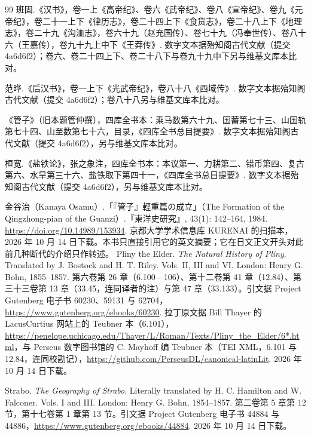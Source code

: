 \begin{thebibliography}{99}
 班固.《汉书》，卷一上《高帝纪》、卷六《武帝纪》、卷八《宣帝纪》、卷九《元帝纪》，卷二十一上下《律历志》，卷二十四上下《食货志》，卷二十八上下《地理志》，卷二十九《沟洫志》，卷六十九（赵充国传）、卷七十九（冯奉世传）、卷八十六（王嘉传），卷九十九上中下《王莽传》. 数字文本据殆知阁古代文献（提交 4a6d6f2）；卷六、卷二十四上下、卷二十八下与卷九十九中下另与维基文库本比对。

 范晔.《后汉书》，卷一上下《光武帝纪》，卷八十八《西域传》. 数字文本据殆知阁古代文献（提交 4a6d6f2）；卷八十八另与维基文库本比对。

 《管子》（旧本题管仲撰），四库全书本：乘马数第六十九、国蓄第七十三、山国轨第七十四、山至数第七十六，目录，《四库全书总目提要》. 数字文本据殆知阁古代文献（提交 4a6d6f2），另与维基文库本比对。

 桓宽.《盐铁论》，张之象注，四库全书本：本议第一、力耕第二、错币第四、复古第六、水旱第三十六、盐铁取下第四十一，《四库全书总目提要》. 数字文本据殆知阁古代文献（提交 4a6d6f2），另与维基文库本比对。

 金谷治（Kanaya Osamu）.「『管子』輕重篇の成立」（The Formation of the Qingzhong-pian of the Guanzi）.『東洋史研究』, 43(1): 142--164, 1984. \url{https://doi.org/10.14989/153934}. 京都大学学术信息库 KURENAI 的扫描本，2026 年 10 月 14 日下载。本书只直接引用它的英文摘要；它在日文正文开头对此前几种断代的介绍只作转述。
 Pliny the Elder. \emph{The Natural History of Pliny}. Translated by J. Bostock and H. T. Riley. Vols. II, III and VI. London: Henry G. Bohn, 1855--1857. 第六卷第 26 章（6.100—106）、第十二卷第 41 章（12.84）、第三十三卷第 13 章（33.45，连同译者的注）与第 47 章（33.133）。引文据 Project Gutenberg 电子书 60230、59131 与 62704，\url{https://www.gutenberg.org/ebooks/60230}. 拉丁原文据 Bill Thayer 的 LacusCurtius 网站上的 Teubner 本（6.101），\url{https://penelope.uchicago.edu/Thayer/L/Roman/Texts/Pliny_the_Elder/6*.html}，与 Perseus 数字图书馆的 C. Mayhoff 编 Teubner 本（TEI XML，6.101 与 12.84，连同校勘记），\url{https://github.com/PerseusDL/canonical-latinLit}. 2026 年 10 月 14 日下载。

 Strabo. \emph{The Geography of Strabo}. Literally translated by H. C. Hamilton and W. Falconer. Vols. I and III. London: Henry G. Bohn, 1854--1857. 第二卷第 5 章第 12 节，第十七卷第 1 章第 13 节。引文据 Project Gutenberg 电子书 44884 与 44886，\url{https://www.gutenberg.org/ebooks/44884}. 2026 年 10 月 14 日下载。


\end{thebibliography}
